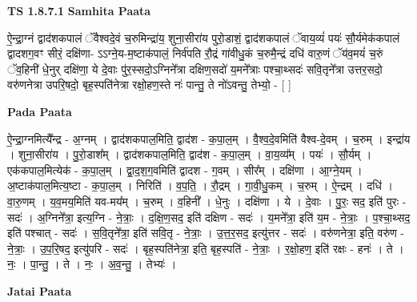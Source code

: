 \documentclass[17pt]{extarticle}
\begin{document}
\textbf{TS 1.8.7.1 } \newline
\textbf{Samhita Paata} \newline

ऐ॒न्द्रा॒ग्नं द्वाद॑शकपालं ॅवैश्वदे॒वं च॒रुमिन्द्रा॑य॒ शुना॒सीरा॑य पुरो॒डाशं॒ द्वाद॑शकपालं ॅवाय॒व्यं॑ पयः॑ सौ॒र्यमेक॑कपालं द्वादशग॒वꣳ सीरं॒ दक्षि॑णा- ऽऽग्ने॒य-म॒ष्टाक॑पालं॒ निर्व॑पति रौ॒द्रं गा॑वीधु॒कं च॒रुमै॒न्द्रं दधि॑ वारु॒णं ॅय॑व॒मयं॑ च॒रुं ॅव॒हिनी॑ धे॒नुर् दक्षि॑णा॒ ये दे॒वाः पु॑र॒स्सदो॒ऽग्निने᳚त्रा दक्षिण॒सदो॑ य॒मने᳚त्राः पश्चा॒थ्सदः॑ सवि॒तृने᳚त्रा उत्तर॒सदो॒ वरु॑णनेत्रा उपरि॒षदो॒ बृह॒स्पति॑नेत्रा रक्षो॒हण॒स्ते नः॑ पान्तु॒ ते नो॑ऽवन्तु॒ तेभ्यो॒ - [ ] \newline

\textbf{Pada Paata} \newline

ऐ॒न्द्रा॒ग्नमित्यै᳚न्द्र - अ॒ग्नम् । द्वाद॑शकपाल॒मिति॒ द्वाद॑श - क॒पा॒ल॒म् । वै॒श्व॒दे॒वमिति॑ वैश्व-दे॒वम् । च॒रुम् । इन्द्रा॑य । शुना॒सीरा॑य । पु॒रो॒डाश᳚म् । द्वाद॑शकपाल॒मिति॒ द्वाद॑श - क॒पा॒ल॒म् । वा॒य॒व्य᳚म् । पयः॑ । सौ॒र्यम् । एक॑कपाल॒मित्येक॑ - क॒पा॒ल॒म् । द्वा॒द॒श॒ग॒वमिति॑ द्वादश - ग॒वम् । सीर᳚म् । दक्षि॑णा । आ॒ग्ने॒यम् । अ॒ष्टाक॑पाल॒मित्य॒ष्टा - क॒पा॒ल॒म् । निरिति॑ । व॒प॒ति॒ । रौ॒द्रम् । गा॒वी॒धु॒कम् । च॒रुम् । ऐ॒न्द्रम् । दधि॑ । वा॒रु॒णम् । य॒व॒मय॒मिति॑ यव-मय᳚म् । च॒रुम् । व॒हिनी᳚ । धे॒नुः । दक्षि॑णा । ये । दे॒वाः । पु॒रः॒ सद॒ इति॑ पुरः - सदः॑ । अ॒ग्निने᳚त्रा॒ इत्य॒ग्नि - ने॒त्राः॒ । द॒क्षि॒ण॒सद॒ इति॑ दक्षिण - सदः॑ । य॒मने᳚त्रा॒ इति॑ य॒म - ने॒त्राः॒ । प॒श्चा॒थ्सद॒ इति॑ पश्चात् - सदः॑ । स॒वि॒तृने᳚त्रा॒ इति॑ सवि॒तृ - ने॒त्राः॒ । उ॒त्त॒र॒सद॒ इत्यु॑त्तर - सदः॑ । वरु॑णनेत्रा॒ इति॒ वरु॑ण - ने॒त्राः॒ । उ॒प॒रि॒षद॒ इत्यु॑परि - सदः॑ । बृह॒स्पति॑नेत्रा॒ इति॒ बृह॒स्पति॑ - ने॒त्राः॒ । र॒क्षो॒हण॒ इति॑ रक्षः - हनः॑ । ते । नः॒ । पा॒न्तु॒ । ते । नः॒ । अ॒व॒न्तु॒ । तेभ्यः॑ ।  \newline



\textbf{Jatai Paata} \newline
\end{document}
